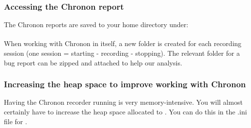 \subsubsection{Accessing the Chronon report}
The Chronon reports are saved to your home directory under:\\
\\

When working with Chronon in \app{} itself, a new folder is created for each recording session (one session = starting - recording - stopping). The relevant folder for a bug report can be zipped and attached to help our analysis. 


\subsubsection{Increasing the heap space to improve working with Chronon}
Having the Chronon recorder running is very memory-intensive. You will almost certainly have to increase the heap space allocated to \app{}. You can do this in the .ini file for \app{}. 



